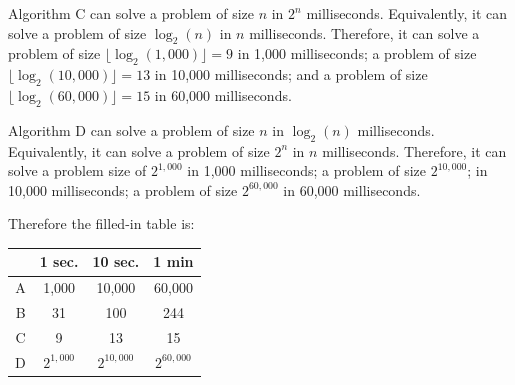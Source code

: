\begin{prob}
\begin{soln}
        Algorithm C can solve a problem of size $n$ in $2^n$ milliseconds. Equivalently, it can solve a problem of size $\log_2(n)$ in $n$ milliseconds. Therefore, it can solve a problem of size $\lfloor \log_2{(1,000)} \rfloor = 9$ in 1,000 milliseconds; a problem of size $\lfloor \log_2{(10,000)} \rfloor = 13$
        in 10,000 milliseconds; and a problem of size
        $\lfloor \log_2{(60,000)} \rfloor = 15 $ in 60,000 milliseconds.

        Algorithm D can solve a problem of size $n$ in $\log_2(n)$ milliseconds. Equivalently, it can solve a problem of size $2^n$ in $n$ milliseconds. Therefore, it can solve a problem size of $2^{1,000}$ in 1,000 milliseconds; a problem of size $2^{10,000}$; in 10,000 milliseconds; a problem of size $2^{60,000}$ in 60,000 milliseconds.

        Therefore the filled-in table is:

        \begin{center}
            \begin{tabular}{rccc}
                \toprule
                  & 1 sec.      & 10 sec.      & 1 min        \\ \midrule
                A & 1,000       & 10,000       & 60,000       \\
                B & 31          & 100          & 244          \\
                C & 9           & 13           & 15           \\
                D & $2^{1,000}$ & $2^{10,000}$ & $2^{60,000}$ \\ \bottomrule
            \end{tabular}
        \end{center}


    \end{soln}

\end{prob}
